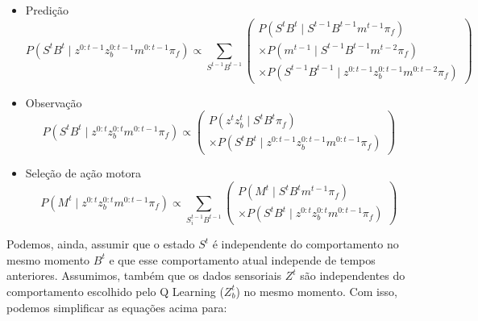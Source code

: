 \begin{itemize}
	\item Predição
		\begin{equation}
    P \left( S^t B^t \mid z^{0: t-1} z_b^{0: t-1} m^{0: t-1} \pi_f \right) \propto \sum\limits_{S^{t-1} B^{t-1}}
        \left(
            \begin{array}{l}
                P \left( S^t B^t \mid S^{t-1} B^{t-1}  m^{t-1} \pi_f \right) \\
                \times P \left( m^{t-1} \mid S^{t-1} B^{t-1} m^{t-2} \pi_f \right)\\
                \times P \left( S^{t-1} B^{t-1} \mid z^{0: t-1} z_b^{0: t-1} m^{0: t-2} \pi_f \right)
            \end{array}
        \right)
		\end{equation}
	\item Observação
		\begin{equation}
    P \left( S^t B^t \mid z^{0: t} z_b^{0: t} m^{0: t-1} \pi_f \right) \propto
        \left(
            \begin{array}{l}
                P \left( z^t z_b^t \mid S^t B^t \pi_f \right) \\
                \times P \left( S^t B^t \mid z^{0: t-1} z_b^{0: t-1} m^{0: t-1} \pi_f \right)
            \end{array}
        \right)
		\end{equation}
	\item Seleção de ação motora
		\begin{equation}
    P \left( M^t \mid z^{0: t} z_b^{0: t} m^{0: t-1} \pi_f \right) \propto \sum\limits_{S_i^{t-1} B^{t-1}}
        \left(
            \begin{array}{l}
                P \left( M^t \mid S^t B^t m^{t-1} \pi_f \right)\\
                \times P \left( S^t B^t \mid z^{0: t} z_b^{0: t} m^{0: t-1} \pi_f \right)
            \end{array}
        \right)
		\end{equation}
\end{itemize}

Podemos, ainda, assumir que o estado $ S^t $ é independente do comportamento no mesmo momento $ B^t $ e que esse comportamento atual independe de tempos anteriores. Assumimos, também que os dados sensoriais $ Z^t $ são independentes do comportamento escolhido pelo Q Learning ($ Z_b^t $) no mesmo momento. Com isso, podemos simplificar as equações acima para:

